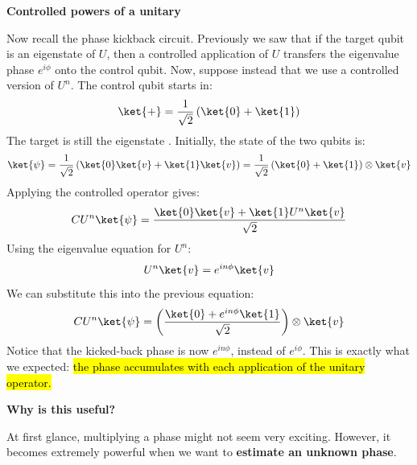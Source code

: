 \highspace
\begin{flushleft}
    \textcolor{Green3}{ \textbf{Controlled powers of a unitary}}
\end{flushleft}
Now recall the phase kickback circuit. Previously we saw that if the target qubit is an eigenstate of $U$, then a controlled application of $U$ transfers the eigenvalue phase $e^{i \phi}$ onto the control qubit. Now, suppose instead that we use a controlled version of $U^n$. The control qubit starts in:
\begin{equation*}
    \ket{+} = \frac{1}{\sqrt{2}} \left(\ket{0} + \ket{1}\right)
\end{equation*}
The target is still the eigenstate . Initially, the state of the two qubits is:
\begin{equation*}
    \ket{\psi} = \frac{1}{\sqrt{2}} \left(\ket{0}\ket{v} + \ket{1}\ket{v}\right) = \frac{1}{\sqrt{2}} \left(\ket{0} + \ket{1}\right) \otimes \ket{v}
\end{equation*}
Applying the controlled operator gives:
\begin{equation*}
    CU^{n}\ket{\psi} = \frac{\ket{0}\ket{v} + \ket{1} U^{n} \ket{v}}{\sqrt{2}}
\end{equation*}
Using the eigenvalue equation for $U^n$:
\begin{equation*}
    U^{n} \ket{v} = e^{i n \phi} \ket{v}
\end{equation*}
We can substitute this into the previous equation:
\begin{equation}
    CU^{n}\ket{\psi} = \left(\frac{\ket{0} + e^{i n \phi} \ket{1}}{\sqrt{2}}\right) \otimes \ket{v}
\end{equation}
Notice that the kicked-back phase is now $e^{i n \phi}$, instead of $e^{i \phi}$. This is exactly what we expected: \hl{the phase accumulates with each application of the unitary operator.}

\highspace
\begin{flushleft}
    \textcolor{Green3}{ \textbf{Why is this useful?}}
\end{flushleft}
At first glance, multiplying a phase might not seem very exciting. However, it becomes extremely powerful when we want to \textbf{estimate an unknown phase}.

